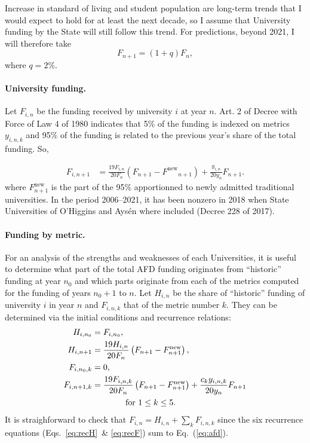 \documentclass[twocolumn]{article}
\def\Fnew{\ensuremath{F^\text{new}}}
\begin{document}
Increase in standard of living and student population are long-term trends that I would expect to hold for at least the next decade, so I assume that University funding by the State will still follow this trend. For predictions, beyond 2021, I will therefore take
\begin{equation}
    F_{n+1} = (1+q) F_n, \label{eq:F}
\end{equation}
where $q = 2$\%.

\paragraph{University funding.}
Let $F_{i,n}$ be the funding received by university $i$ at year $n$. Art. 2 of
Decree with Force of Law 4 of 1980 indicates that 5\% of the funding is indexed
on metrics $y_{i,n,k}$ and 95\% of the funding is related to the previous year's
share of the total funding.  So,

\begin{align}
    F_{i,n+1} &= \frac{19F_{i,n}}{20F_{n}}\left(F_{n+1} - \Fnew_{n+1}\right)
               + \frac{y_{i,n}}{20y_n} F_{n+1}.
        \label{eq:afd}
\end{align}
where $F_{n+1}^\text{new}$ is the part of the 95\% apportionned to newly admitted traditional universities.  In the period 2006--2021, it has been nonzero in 2018 when State Universities of O'Higgins and Aysén where included (Decree 228 of 2017).  

\paragraph{Funding by metric.}  For an analysis of the strengths and weaknesses of each Universities, it is useful to determine what part of the total AFD funding originates from ``historic'' funding at year $n_0$ and which parts originate from each of the metrics computed for the funding of years $n_0 + 1$ to $n$. Let $H_{i,n}$ be the share of ``historic'' funding of university $i$ in year $n$ and $F_{i,n,k}$ that of the metric number $k$. They can be determined via the initial conditions and recurrence relations:
\begin{align}
  H_{i, n_0}  &= F_{i, n_0},\\
  H_{i,n+1}   &= \frac{19H_{i,n}}{20F_n}   \left(F_{n+1}-\Fnew_{n+1}\right),
                    \label{eq:recH}\\
  F_{i,n_0,k} &= 0,\\
  F_{i,n+1,k} &= \frac{19F_{i,n,k}}{20F_n} \left(F_{n+1} - \Fnew_{n+1}\right)
                  + \frac{c_k y_{i,n,k}}{20y_n} F_{n+1}
                    \label{eq:recF}\\
              &\qquad\qquad \text{for $1 \le k \le 5$}. \notag
\end{align}
It is straighforward to check that $F_{i,n} = H_{i,n} + \sum_k F_{i,n,k}$ since the six recurrence equations (Eqs.~\ref{eq:recH}~\& \ref{eq:recF}) sum to Eq.~(\ref{eq:afd}). 
\end{document}
